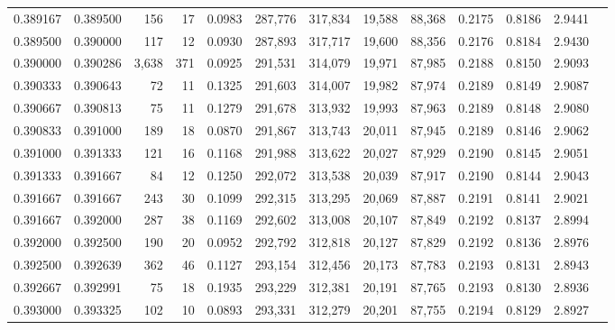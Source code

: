 \begin{tabular}{rrrrrrrrrrrrr}
0.389167 & 0.389500 &   156 &  17 &                                     0.0983 & 287,776 & 317,834 &  19,588 &  88,368 & 0.2175 & 0.8186 & 2.9441 \\
0.389500 & 0.390000 &   117 &  12 &                                     0.0930 & 287,893 & 317,717 &  19,600 &  88,356 & 0.2176 & 0.8184 & 2.9430 \\
0.390000 & 0.390286 & 3,638 & 371 &                                     0.0925 & 291,531 & 314,079 &  19,971 &  87,985 & 0.2188 & 0.8150 & 2.9093 \\
0.390333 & 0.390643 &    72 &  11 &                                     0.1325 & 291,603 & 314,007 &  19,982 &  87,974 & 0.2189 & 0.8149 & 2.9087 \\
0.390667 & 0.390813 &    75 &  11 &                                     0.1279 & 291,678 & 313,932 &  19,993 &  87,963 & 0.2189 & 0.8148 & 2.9080 \\
0.390833 & 0.391000 &   189 &  18 &                                     0.0870 & 291,867 & 313,743 &  20,011 &  87,945 & 0.2189 & 0.8146 & 2.9062 \\
0.391000 & 0.391333 &   121 &  16 &                                     0.1168 & 291,988 & 313,622 &  20,027 &  87,929 & 0.2190 & 0.8145 & 2.9051 \\
0.391333 & 0.391667 &    84 &  12 &                                     0.1250 & 292,072 & 313,538 &  20,039 &  87,917 & 0.2190 & 0.8144 & 2.9043 \\
0.391667 & 0.391667 &   243 &  30 &                                     0.1099 & 292,315 & 313,295 &  20,069 &  87,887 & 0.2191 & 0.8141 & 2.9021 \\
0.391667 & 0.392000 &   287 &  38 &                                     0.1169 & 292,602 & 313,008 &  20,107 &  87,849 & 0.2192 & 0.8137 & 2.8994 \\
0.392000 & 0.392500 &   190 &  20 &                                     0.0952 & 292,792 & 312,818 &  20,127 &  87,829 & 0.2192 & 0.8136 & 2.8976 \\
0.392500 & 0.392639 &   362 &  46 &                                     0.1127 & 293,154 & 312,456 &  20,173 &  87,783 & 0.2193 & 0.8131 & 2.8943 \\
0.392667 & 0.392991 &    75 &  18 &                                     0.1935 & 293,229 & 312,381 &  20,191 &  87,765 & 0.2193 & 0.8130 & 2.8936 \\
0.393000 & 0.393325 &   102 &  10 &                                     0.0893 & 293,331 & 312,279 &  20,201 &  87,755 & 0.2194 & 0.8129 & 2.8927 \\

\end{tabular}
